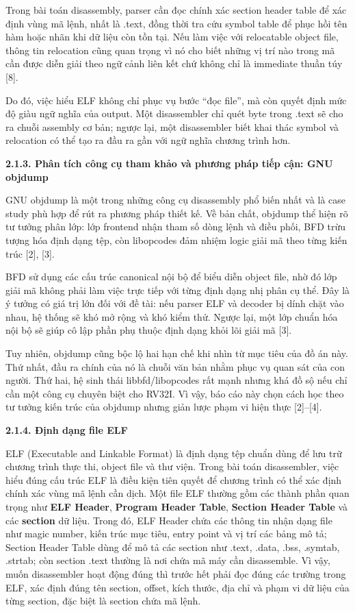 \documentclass[
]{article}
\begin{document}
Trong bài toán disassembly, parser cần đọc chính xác section header
table để xác định vùng mã lệnh, nhất là .text, đồng thời tra cứu symbol
table để phục hồi tên hàm hoặc nhãn khi dữ liệu còn tồn tại. Nếu làm
việc với relocatable object file, thông tin relocation cũng quan trọng
vì nó cho biết những vị trí nào trong mã cần được diễn giải theo ngữ
cảnh liên kết chứ không chỉ là immediate thuần túy {[}8{]}.

Do đó, việc hiểu ELF không chỉ phục vụ bước ``đọc file'', mà còn quyết
định mức độ giàu ngữ nghĩa của output. Một disassembler chỉ quét byte
trong .text sẽ cho ra chuỗi assembly cơ bản; ngược lại, một disassembler
biết khai thác symbol và relocation có thể tạo ra đầu ra gần với ngữ
nghĩa chương trình hơn.

\textbf{2.1.3. Phân tích công cụ tham khảo và phương pháp tiếp cận: GNU
objdump}

GNU objdump là một trong những công cụ disassembly phổ biến nhất và là
case study phù hợp để rút ra phương pháp thiết kế. Về bản chất, objdump
thể hiện rõ tư tưởng phân lớp: lớp frontend nhận tham số dòng lệnh và
điều phối, BFD trừu tượng hóa định dạng tệp, còn libopcodes đảm nhiệm
logic giải mã theo từng kiến trúc {[}2{]}, {[}3{]}.

BFD sử dụng các cấu trúc canonical nội bộ để biểu diễn object file, nhờ
đó lớp giải mã không phải làm việc trực tiếp với từng định dạng nhị phân
cụ thể. Đây là ý tưởng có giá trị lớn đối với đề tài: nếu parser ELF và
decoder bị dính chặt vào nhau, hệ thống sẽ khó mở rộng và khó kiểm thử.
Ngược lại, một lớp chuẩn hóa nội bộ sẽ giúp cô lập phần phụ thuộc định
dạng khỏi lõi giải mã {[}3{]}.

Tuy nhiên, objdump cũng bộc lộ hai hạn chế khi nhìn từ mục tiêu của đồ
án này. Thứ nhất, đầu ra chính của nó là chuỗi văn bản nhằm phục vụ quan
sát của con người. Thứ hai, hệ sinh thái libbfd/libopcodes rất mạnh
nhưng khá đồ sộ nếu chỉ cần một công cụ chuyên biệt cho RV32I. Vì vậy,
báo cáo này chọn cách học theo tư tưởng kiến trúc của objdump nhưng giản
lược phạm vi hiện thực {[}2{]}--{[}4{]}.

\textbf{2.1.4. Định dạng file ELF}

ELF (Executable and Linkable Format) là định dạng tệp chuẩn dùng để lưu
trữ chương trình thực thi, object file và thư viện. Trong bài toán
disassembler, việc hiểu đúng cấu trúc ELF là điều kiện tiên quyết để
chương trình có thể xác định chính xác vùng mã lệnh cần dịch. Một file
ELF thường gồm các thành phần quan trọng như \textbf{ELF Header},
\textbf{Program Header Table}, \textbf{Section Header Table} và các
\textbf{section} dữ liệu. Trong đó, ELF Header chứa các thông tin nhận
dạng file như magic number, kiến trúc mục tiêu, entry point và vị trí
các bảng mô tả; Section Header Table dùng để mô tả các section như
.text, .data, .bss, .symtab, .strtab; còn section .text thường là nơi
chứa mã máy cần disassemble. Vì vậy, muốn disassembler hoạt động đúng
thì trước hết phải đọc đúng các trường trong ELF, xác định đúng tên
section, offset, kích thước, địa chỉ và phạm vi dữ liệu của từng
section, đặc biệt là section chứa mã lệnh.
\end{document}
